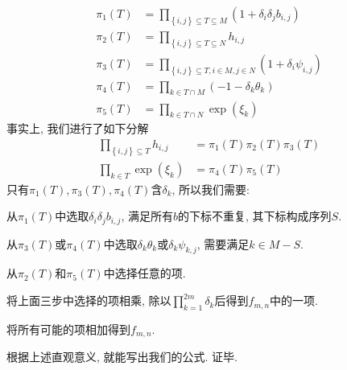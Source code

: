 \documentclass{article}
\newcommand{\sbrace}[1]{\left(#1\right)}
\newcommand{\bbrace}[1]{\left\{#1\right\}}
\begin{document}
\begin{equation}
\begin{aligned}
  \pi_1(T)&=\prod_{\bbrace{i,j}\subseteq T\subseteq M}\sbrace{1+\delta_i \delta_j b_{i,j}} \\
  \pi_2(T)&=\prod_{\bbrace{i,j}\subseteq T\subseteq N}{h_{i,j}} \\
  \pi_3(T)&=\prod_{\bbrace{i,j}\subseteq T,i\in M,j\in N}\sbrace{1+\delta_i \psi_{i,j}} \\
  \pi_4(T)&=\prod_{k\in T\cap M}\sbrace{-1-\delta_k \theta_k} \\
  \pi_5(T)&=\prod_{k\in T\cap N}{\exp(\xi_k)}
\end{aligned}
\end{equation}
事实上, 我们进行了如下分解 
\begin{equation}
\begin{aligned}
  \prod_{\bbrace{i,j}\subseteq T}{h_{i,j}}&=\pi_1(T)\pi_2(T)\pi_3(T) \\ 
  \prod_{k\in T}{\exp(\xi_k)}&=\pi_4(T)\pi_5(T)
\end{aligned}
\end{equation}
只有$\pi_1(T),\pi_3(T),\pi_4(T)$含$\delta_k$, 所以我们需要:
\begin{compactenum}[Step 1.]
\item 从$\pi_1(T)$中选取$\delta_i \delta_j b_{i,j}$, 满足所有$b$的下标不重复, 其下标构成序列$S$.
\item 从$\pi_3(T)$或$\pi_4(T)$中选取$\delta_k \theta_k$或$\delta_k \psi_{k,j}$, 需要满足$k\in M-S$.
\item 从$\pi_2(T)$和$\pi_5(T)$中选择任意的项.
\item 将上面三步中选择的项相乘, 除以$\prod_{k=1}^{2m}{\delta_k}$后得到$f_{m,n}$中的一项.
\item 将所有可能的项相加得到$f_{m,n}$.
\end{compactenum}
根据上述直观意义, 就能写出我们的公式. 证毕. 
\end{document}
